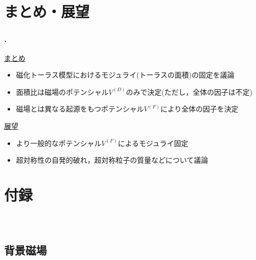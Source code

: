 \documentclass[aspectratio=169,
  a4paper,uplatex,dvipdfmx,11pt,
  xcolor = {dvipsnames,svgnames},
  hyperref ={colorlinks=true,citecolor=Navy,linkcolor=NavyBlue,urlcolor=purple}
]{beamer}
\renewcommand{\theequation}{\thesection.\arabic{equation}}
\renewcommand{\thefigure}{\thesection.\arabic{figure}}
\renewcommand{\thetable}{\thesection.\arabic{table}}
\begin{document}

\section{まとめ・展望}

\begin{frame}
  \frametitle{\thesection.\ \secname}

  \uline{まとめ}
  \begin{itemize}
    \item 
    磁化トーラス模型におけるモジュライ(トーラスの面積)の固定を議論
    \item 
    面積比は磁場のポテンシャル$V^{(D)}$のみで決定(ただし，全体の因子は不定)
    \item 
    磁場とは異なる起源をもつポテンシャル$V^{(F)}$により全体の因子を決定
  \end{itemize}

  \uline{展望}
  \begin{itemize}
    \item 
    より一般的なポテンシャル$V^{(F)}$によるモジュライ固定
    \item 
    超対称性の自発的破れ，超対称粒子の質量などについて議論
  \end{itemize}

\end{frame}


\setcounter{Appendix}{\value{framenumber}}
\setcounter{section}{0}
\renewcommand{\thesubsection}{\Alph{subsection}}
\makeatletter
   \renewcommand{\theequation}{\thesubsection.\arabic{equation}}
   
   \renewcommand{\thefigure}{\thesubsection.\arabic{figure}}
   
   \renewcommand{\thetable}{\thesubsection.\arabic{table}}
\makeatother

\section{付録}

\begin{frame}[plain]
  \frametitle{\ }
  \huge \secname
\end{frame}

\subsection{背景磁場}
\end{document}
